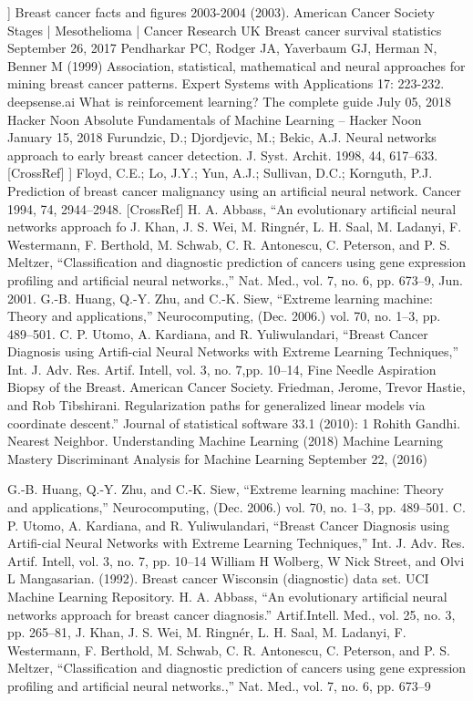 \documentclass[conference]{IEEEtran}
\begin{document}
\begin{thebibliography}{00}
] Breast cancer facts and figures 2003-2004 (2003). American Cancer Society
Stages | Mesothelioma | Cancer Research UK Breast cancer survival statistics September 26, 2017
Pendharkar PC, Rodger JA, Yaverbaum GJ, Herman N, Benner M (1999) Association, statistical, mathematical and neural approaches for mining breast cancer patterns. Expert Systems with Applications 17: 223-232.
deepsense.ai What is reinforcement learning? The complete guide July 05, 2018
Hacker Noon Absolute Fundamentals of Machine Learning – Hacker Noon January 15, 2018
 Furundzic, D.; Djordjevic, M.; Bekic, A.J. Neural networks approach to early breast cancer detection. J. Syst. Archit. 1998, 44, 617–633. [CrossRef]
] Floyd, C.E.; Lo, J.Y.; Yun, A.J.; Sullivan, D.C.; Kornguth, P.J. Prediction of breast cancer malignancy using an artificial neural network. Cancer 1994, 74, 2944–2948. [CrossRef]
H. A. Abbass, “An evolutionary artificial neural networks approach fo
J. Khan, J. S. Wei, M. Ringnér, L. H. Saal, M. Ladanyi, F. Westermann, F. Berthold, M. Schwab, C. R. Antonescu, C. Peterson, and P. S. Meltzer, “Classification and diagnostic prediction of cancers using gene expression profiling and artificial neural networks.,” Nat. Med., vol. 7, no.
6, pp. 673–9, Jun. 2001.
  G.-B. Huang, Q.-Y. Zhu, and C.-K. Siew, “Extreme learning machine: Theory and applications,” Neurocomputing, (Dec. 2006.) vol. 70, no. 1–3, pp. 489–501.
 C. P. Utomo, A. Kardiana, and R. Yuliwulandari, “Breast Cancer Diagnosis using Artifi-cial Neural Networks with Extreme Learning Techniques,” Int. J. Adv. Res. Artif. Intell, vol. 3, no. 7,pp. 10–14,
 Fine Needle Aspiration Biopsy of the Breast. American Cancer Society.
 Friedman, Jerome, Trevor Hastie, and Rob Tibshirani. Regularization paths for generalized linear models via coordinate descent.” Journal of statistical software 33.1 (2010): 1
Rohith Gandhi. Nearest Neighbor. Understanding Machine Learning (2018)
 Machine Learning Mastery Discriminant Analysis for Machine Learning September 22, (2016)

 G.-B. Huang, Q.-Y. Zhu, and C.-K. Siew, “Extreme learning machine: Theory and applications,” Neurocomputing, (Dec. 2006.) vol. 70, no. 1–3, pp. 489–501.
 C. P. Utomo, A. Kardiana, and R. Yuliwulandari, “Breast Cancer Diagnosis using Artifi-cial Neural Networks with Extreme Learning Techniques,” Int. J. Adv. Res. Artif. Intell, vol. 3, no. 7, pp. 10–14
 William H Wolberg, W Nick Street, and Olvi L Mangasarian. (1992). Breast cancer Wisconsin (diagnostic) data set. UCI Machine Learning Repository.
H. A. Abbass, “An evolutionary artificial neural networks approach for breast cancer diagnosis.” Artif.Intell. Med., vol. 25, no. 3, pp. 265–81,
 J. Khan, J. S. Wei, M. Ringnér, L. H. Saal, M. Ladanyi, F. Westermann, F. Berthold, M. Schwab, C. R. Antonescu, C. Peterson, and P. S. Meltzer, “Classification and diagnostic prediction of cancers using gene expression profiling and artificial neural networks.,” Nat. Med., vol. 7, no.
6, pp. 673–9
\end{thebibliography}
\end{document}
